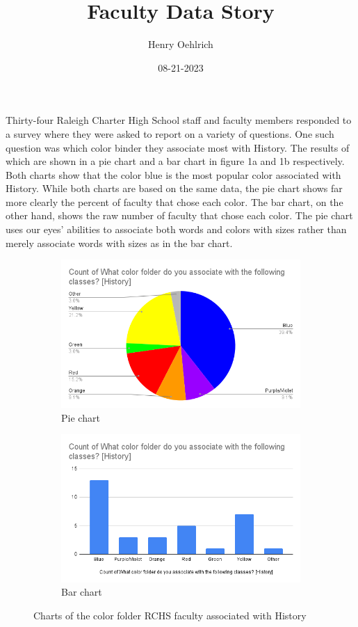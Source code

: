 \documentclass{article}
\title{Faculty Data Story}
\author{Henry Oehlrich}
\date{08-21-2023}
\begin{document}
\maketitle{}

Thirty-four Raleigh Charter High School staff and faculty members responded to
a survey where they were asked to report on a variety of questions. One such
question was which color binder they associate most with History. The results
of which are shown in a pie chart and a bar chart in figure 1a and 1b
respectively. Both charts show that the color blue is the most popular color
associated with History. While both charts are based on the same data, the pie
chart shows far more clearly the percent of faculty that chose each color. The
bar chart, on the other hand, shows the raw number of faculty that chose each
color. The pie chart uses our eyes' abilities to associate both words and
colors with sizes rather than merely associate words with sizes as in the bar
chart.

\begin{figure}[h]
    \centering
    \begin{subfigure}{.5\textwidth}
        \centering
        \includegraphics[width=\linewidth]{history-binder-color-pie.png}
        \caption{Pie chart}
        \label{fig:test1}
    \end{subfigure}%
    \begin{subfigure}{.5\textwidth}
        \centering
        \includegraphics[width=\linewidth]{history-binder-color-bar.png}
        \caption{Bar chart}
        \label{fig:test2}
    \end{subfigure}
    \caption{Charts of the color folder RCHS faculty associated with History}
\end{figure}
\end{document}
